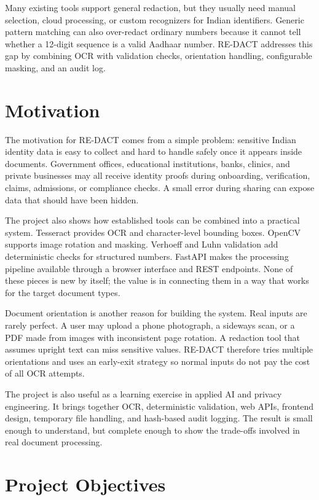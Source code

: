 Many existing tools support general redaction, but they usually need manual selection, cloud processing, or custom recognizers for Indian identifiers. Generic pattern matching can also over-redact ordinary numbers because it cannot tell whether a 12-digit sequence is a valid Aadhaar number. RE-DACT addresses this gap by combining OCR with validation checks, orientation handling, configurable masking, and an audit log.

\section{Motivation}

The motivation for RE-DACT comes from a simple problem: sensitive Indian identity data is easy to collect and hard to handle safely once it appears inside documents. Government offices, educational institutions, banks, clinics, and private businesses may all receive identity proofs during onboarding, verification, claims, admissions, or compliance checks. A small error during sharing can expose data that should have been hidden.

The project also shows how established tools can be combined into a practical system. Tesseract provides OCR and character-level bounding boxes. OpenCV supports image rotation and masking. Verhoeff and Luhn validation add deterministic checks for structured numbers. FastAPI makes the processing pipeline available through a browser interface and REST endpoints. None of these pieces is new by itself; the value is in connecting them in a way that works for the target document types.

Document orientation is another reason for building the system. Real inputs are rarely perfect. A user may upload a phone photograph, a sideways scan, or a PDF made from images with inconsistent page rotation. A redaction tool that assumes upright text can miss sensitive values. RE-DACT therefore tries multiple orientations and uses an early-exit strategy so normal inputs do not pay the cost of all OCR attempts.

The project is also useful as a learning exercise in applied AI and privacy engineering. It brings together OCR, deterministic validation, web APIs, frontend design, temporary file handling, and hash-based audit logging. The result is small enough to understand, but complete enough to show the trade-offs involved in real document processing.

\section{Project Objectives}

